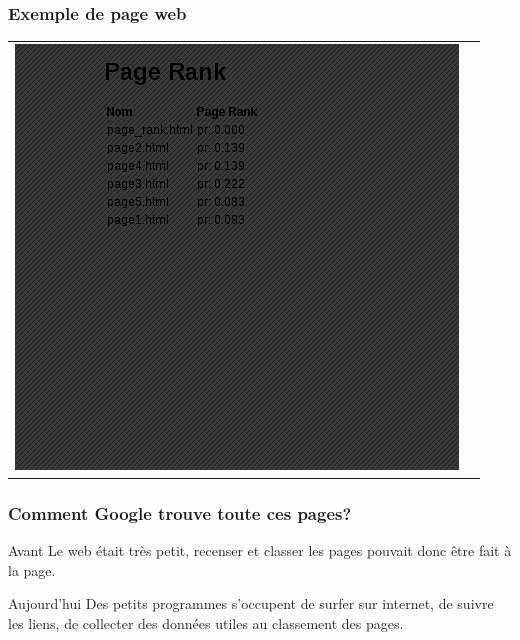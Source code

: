 \documentclass{beamer}
\begin{document}
\begin{frame}
  \frametitle{Exemple de page web}
  \begin{tabular}{cc}
    \begin{minipage}{0.37\linewidth}\includegraphics[scale=0.3]{exemple_web}\end{minipage} & \begin{minipage}{0.4\linewidth}\end{minipage}
    
\end{tabular}

\end{frame}

\begin{frame}
  \frametitle{Comment Google trouve toute ces pages?}

  
  \begin{block}{Avant}
    Le web était très petit, recenser et classer les pages pouvait
    donc être fait à la page.
  \end{block}
  
  \pause

  \begin{block}{Aujourd'hui}
    Des petits programmes s'occupent de surfer sur internet, de suivre
    les liens, de collecter des données utiles au classement des
    pages.
  \end{block}


\end{frame}
\end{document}
